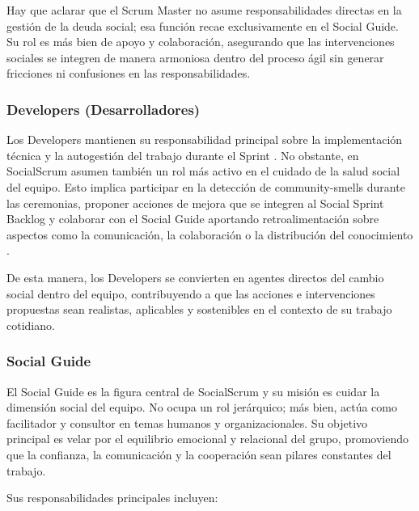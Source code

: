 Hay que aclarar que el Scrum Master no asume responsabilidades directas en la gestión de la deuda social; esa función recae exclusivamente en el Social Guide. Su rol es más bien de apoyo y colaboración, asegurando que las intervenciones sociales se integren de manera armoniosa dentro del proceso ágil sin generar fricciones ni confusiones en las responsabilidades.

\subsubsection{Developers (Desarrolladores)}

Los Developers mantienen su responsabilidad principal sobre la implementación técnica y la autogestión del trabajo durante el Sprint \cite{schwaber2020scrum}. No obstante, en SocialScrum asumen también un rol más activo en el cuidado de la salud social del equipo. Esto implica participar en la detección de \gls{community-smells} durante las ceremonias, proponer acciones de mejora que se integren al Social Sprint Backlog y colaborar con el Social Guide aportando retroalimentación sobre aspectos como la comunicación, la colaboración o la distribución del conocimiento \cite{saeeda2024nontechnicaldebt}.

De esta manera, los Developers se convierten en agentes directos del cambio social dentro del equipo, contribuyendo a que las acciones e intervenciones propuestas sean realistas, aplicables y sostenibles en el contexto de su trabajo cotidiano.

\subsubsection{Social Guide}

El Social Guide es la figura central de SocialScrum y su misión es cuidar la dimensión social del equipo. No ocupa un rol jerárquico; más bien, actúa como facilitador y consultor en temas humanos y organizacionales. Su objetivo principal es velar por el equilibrio emocional y relacional del grupo, promoviendo que la confianza, la comunicación y la cooperación sean pilares constantes del trabajo.

Sus responsabilidades principales incluyen:


